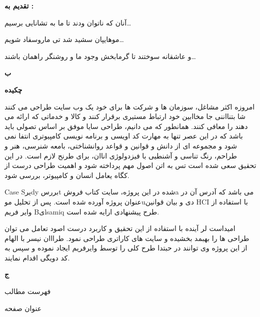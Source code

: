 \documentclass[13pt]{article}
\begin{document}
{\raggedleft
\textbf{تقدیم به :}
}

{\raggedleft
آنان که ناتوان ودند تا ما به تشانایی برسیم\ldots{}
}

{\raggedleft
موهایپان سشید شد تی ماروسفاد شویم\ldots{}
}

{\raggedleft
و عاشقانه سوختند تا گرمابخش وجود ما و روشنگر راهمان باشند\ldots{}
}

\begin{center}
\textbf{{\large ب}}
\end{center}

\textbf{{\small چکیده }}

امروزه اکثر مشاغل، سوزمان ها و شرکت ها برای خود یک وب سایت طراحی می کنند شا
بتنااننی جا مخاابین خود ارتباط مستیری برقرار کنند و کالا و خدماتی که ارائه می
دهند را معافی کنند. همانطور که می دانیم، طراحی سایا  موفق بر اساس تصولی باید باشد
که در این عصر تنها به مهارت کد اویسی و برنامه نویسی کامپیوتری انتفا نمی شود و
مجموعه ای از دانش و قوانین و قواعد روانشناختی، بامعه شنرسی، هنر و طراحم، رنگ
تناسی و آشنطیی با فیزدولوژی اناان، برای طرنح لازم است. در این تحقیق سعی شده است
تس به اتن اصول مهم پرداخته شود و اهمیت طراحی درست از کگاه یعامل انسان و کامپیوتر،
بررسی شود.

Case Sیرdy  بررسt شده در این پروژه، سایت کتاب فروشa می باشد که آدرس آن در عنوان
پروژه آورده شده است. پس از تحلیل موuدی و بیان قوانین HCI با استفاده از وایر فریم
Bیlsamiq طرح پیشنهادی ارایه شده است.

امیداست لر آینده با استفاده از این تحقیق و کاربرد درست اصود تعامل می توان طراحی
ها را بهبمد بخشیده و سایت های کاراتری طراحی نمود. طرااان نیسر با الهام از این
پروژه وی توانند در حبتدا طرح کلی را توسط وایرفریم ایجاد نموده و سپس به کد دویگی
اقدام نمایند.

\begin{center}
\textbf{{\large ج}}
\end{center}

\begin{center}
{\large فهرست مطالب}
\end{center}

{\raggedleft
{\large عنوان
\hspace{15pt}\hspace{15pt}\hspace{15pt}\hspace{15pt}\hspace{15pt}\hspace{15pt}\hspace{15pt}\hspace{15pt}\hspace{15pt}\hspace{15pt}صفحه}
}
\end{document}
